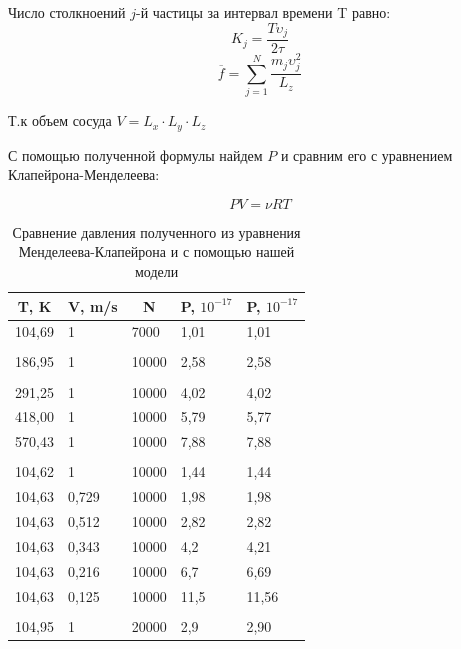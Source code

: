 \documentclass[twoside,twocolumn, 11pt]{article}
\theoremstyle{plain}
\theoremstyle{definition}
\begin{document}
Число столкноений $j$-й частицы за интервал времени T равно:
\[K_j = \dfrac{T \upsilon_j }{2\tau} \]
\[\overline{f} = \sum_{j = 1}^N \dfrac{m_j \upsilon_j^2}{L_z}\]

Т.к объем сосуда $V = L_x \cdot L_y \cdot L_z$

\begin{center}
\end{center}

\indent С помощью полученной формулы найдем $P$ и сравним его с уравнением Клапейрона-Менделеева:

\[PV = \nu R T \]

\begin{table}[h!]
\centering
\label{Table 1}
\begin{tabular}{|l|l|l|l|l|}
\hline
\multicolumn{1}{|c|}{T, K} & \multicolumn{1}{c|}{V, m/s} & \multicolumn{1}{c|}{N} & \multicolumn{1}{c|}{P, $10^{-17}$} & \multicolumn{1}{c|}{P, $10^{-17}$} \\ \hline
104,69 & 1 & 7000 & 1,01 & 1,01                                    \\
& & & &                                         \\
186,95 & 1 & 10000 & 2,58 & 2,58                                    \\
& & & &                                         \\
291,25 & 1 & 10000 & 4,02 & 4,02                                    \\
418,00 & 1 & 10000 & 5,79 & 5,77                                    \\
570,43 & 1 & 10000 & 7,88 & 7,88                                    \\
& & & &                                         \\
104,62 & 1 & 10000 & 1,44 & 1,44                                    \\
104,63 & 0,729 & 10000 & 1,98 & 1,98                                    \\
104,63 & 0,512 & 10000 & 2,82 & 2,82                                    \\
104,63 & 0,343 & 10000 & 4,2 & 4,21                                    \\
104,63 & 0,216 & 10000 & 6,7 & 6,69                                    \\
104,63 & 0,125 & 10000 & 11,5 & 11,56                                   \\
& & & &                                         \\
104,95 & 1 & 20000 & 2,9 & 2,90                                    \\ \hline
\end{tabular}
\caption{Сравнение давления полученного из уравнения Менделеева-Клапейрона и с помощью нашей модели}
\end{table}
\end{document}
